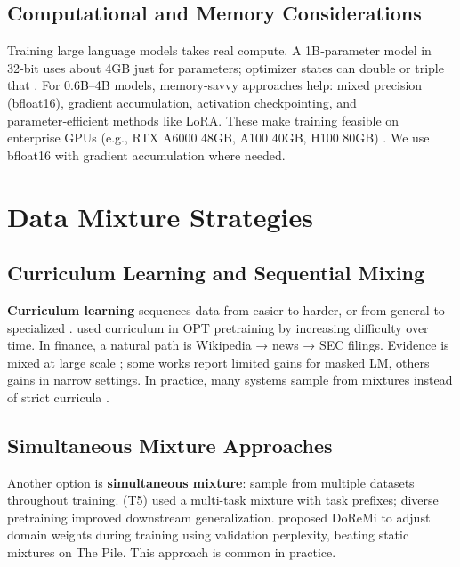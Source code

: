 \subsection{Computational and Memory Considerations}

Training large language models takes real compute. A 1B‑parameter model in 32‑bit uses about 4GB just for parameters; optimizer states can double or triple that \parencite{rajbhandari2020zero,kingma2014adam}. For 0.6B--4B models, memory‑savvy approaches help: mixed precision (bfloat16), gradient accumulation, activation checkpointing, and parameter‑efficient methods like LoRA. These make training feasible on enterprise GPUs (e.g., RTX A6000 48GB, A100 40GB, H100 80GB) \parencite{narayanan2021efficient,hu2021lora}. We use bfloat16 with gradient accumulation where needed.

\section{Data Mixture Strategies}

\subsection{Curriculum Learning and Sequential Mixing}

\textbf{Curriculum learning} sequences data from easier to harder, or from general to specialized \parencite{bengio2009curriculum}. \textcite{wu2022opt} used curriculum in OPT pretraining by increasing difficulty over time. In finance, a natural path is Wikipedia → news → SEC filings. Evidence is mixed at large scale \parencite{longpre2023pretrainer}; some works report limited gains for masked LM, others gains in narrow settings. In practice, many systems sample from mixtures instead of strict curricula \parencite{raffel2020exploring,wu2022opt}.

\subsection{Simultaneous Mixture Approaches}

Another option is \textbf{simultaneous mixture}: sample from multiple datasets throughout training. \textcite{raffel2020exploring} (T5) used a multi-task mixture with task prefixes; diverse pretraining improved downstream generalization. \textcite{xie2023doremi} proposed DoReMi to adjust domain weights during training using validation perplexity, beating static mixtures on The Pile. This approach is common in practice.

